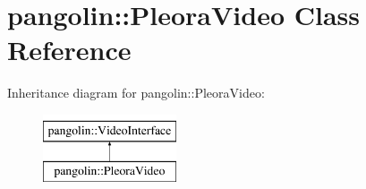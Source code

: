 \hypertarget{classpangolin_1_1_pleora_video}{}\section{pangolin\+:\+:Pleora\+Video Class Reference}
\label{classpangolin_1_1_pleora_video}
Inheritance diagram for pangolin\+:\+:Pleora\+Video\+:\begin{figure}[H]
\begin{center}
\leavevmode
\includegraphics[height=2.000000cm]{classpangolin_1_1_pleora_video}
\end{center}
\end{figure}
